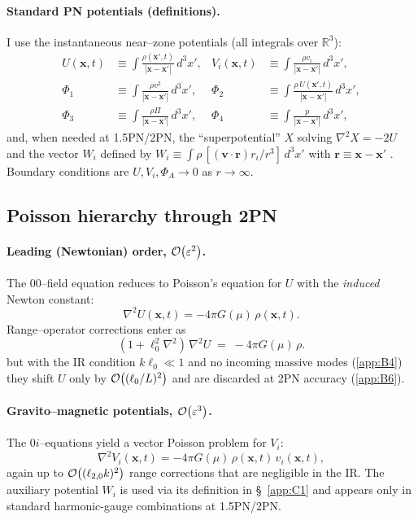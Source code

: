 \documentclass{iopjournal}
\begin{document}
\paragraph{Standard PN potentials (definitions).}
I use the instantaneous near–zone potentials (all integrals over $\mathbb{R}^3$):
\begin{align}
U(\boldsymbol x,t) &\equiv \int \frac{\rho(\boldsymbol x',t)}{|\boldsymbol x-\boldsymbol x'|}\,d^3x',
&
V_i(\boldsymbol x,t) &\equiv \int \frac{\rho v_i}{|\boldsymbol x-\boldsymbol x'|}\,d^3x', \label{eq:C1_defs_UV}\\
\Phi_1 &\equiv \int \frac{\rho v^2}{|\boldsymbol x-\boldsymbol x'|}\,d^3x',
&
\Phi_2 &\equiv \int \frac{\rho\,U(\boldsymbol x',t)}{|\boldsymbol x-\boldsymbol x'|}\,d^3x', \\
\Phi_3 &\equiv \int \frac{\rho \Pi}{|\boldsymbol x-\boldsymbol x'|}\,d^3x',
&
\Phi_4 &\equiv \int \frac{p}{|\boldsymbol x-\boldsymbol x'|}\,d^3x',
\end{align}
and, when needed at 1.5PN/2PN, the ``superpotential'' $X$ solving $\nabla^2 X=-2U$ and the vector $W_i$ defined by
$W_i\equiv \int \rho\,[(\boldsymbol v\!\cdot\!\boldsymbol r) r_i/r^3]\,d^3x'$ with $\boldsymbol r\equiv\boldsymbol x-\boldsymbol x'$ \cite{PoissonWill2014}. Boundary conditions are $U,V_i,\Phi_A\to 0$ as $r\to\infty$.

\subsection{Poisson hierarchy through 2PN}\label{app:C2}
\paragraph{Leading (Newtonian) order, $\order{\varepsilon^2}$.}
The $00$–field equation reduces to Poisson's equation for $U$ with the \emph{induced} Newton constant:
\begin{equation}
\nabla^2 U(\boldsymbol x,t)=-4\pi G(\mu)\,\rho(\boldsymbol x,t).
\label{eq:C2_Poisson_U}
\end{equation}
Range–operator corrections enter as
\[
(1+\ell_0^2\nabla^2)\,\nabla^2 U \;=\; -4\pi G(\mu)\,\rho.
\]
but with the IR condition $k\ell_0\ll1$ and no incoming massive modes (\cref{app:B4}) they shift $U$ only by $\order{(\ell_0/L)^2}$ and are discarded at 2PN accuracy (\cref{app:B6}).


\paragraph{Gravito–magnetic potentials, $\order{\varepsilon^3}$.}
The $0i$–equations yield a vector Poisson problem for $V_i$:
\begin{equation}
\nabla^2 V_i(\boldsymbol x,t)=-4\pi G(\mu)\,\rho(\boldsymbol x,t)\,v_i(\boldsymbol x,t),
\label{eq:C2_Poisson_VW}
\end{equation}
again up to $\order{(\ell_{2,0}k)^2}$ range corrections that are negligible in the IR.
The auxiliary potential $W_i$ is used via its definition in \S\, \cref{app:C1} and appears only in standard harmonic-gauge combinations at 1.5PN/2PN.
\end{document}
